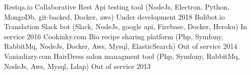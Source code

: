 
\begin{cvhonors}

  \cvhonor
    {Restqa.io} %
    {Collaborative Rest Api testing tool (NodeJs, Electron, Python,  MongoDb, git-backed, Docker, aws)} %
    {Under development} %
    {2018} %
  \cvhonor
    {Bolibot.io} %
    {Translation Slack bot (Slack, NodeJs, google api, Firebase, Docker, Heroku)} %
    {In service} %
    {2016} %
  \cvhonor
    {Cookinky.com} %
    {Bio recipe sharing platform (Php, Symfony, RabbitMq, NodeJs,  Docker, Aws, Mysql, ElasticSearch)} %
    {Out of service} %
    {2014} %
  \cvhonor
    {Vaniadiary.com} %
    {HairDress salon managment tool (Php, Symfony, RabbitMq, NodeJs, Aws, Mysql, Ldap)} %
    {Out of service} %
    {2013} %

\end{cvhonors}
